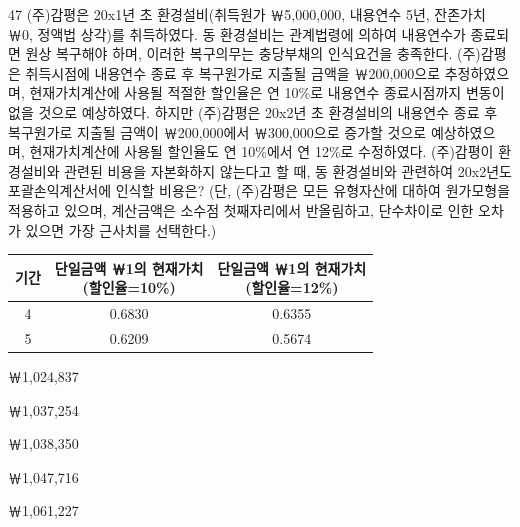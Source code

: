 \begin{question}{47}
(주)감평은 20x1년 초 환경설비(취득원가 ￦5,000,000, 내용연수 5년, 잔존가치 ￦0, 정액법 상각)를 취득하였다. 동 환경설비는 관계법령에 의하여 내용연수가 종료되면 원상 복구해야 하며, 이러한 복구의무는 충당부채의 인식요건을 충족한다. (주)감평은 취득시점에 내용연수 종료 후 복구원가로 지출될 금액을 ￦200,000으로 추정하였으며, 현재가치계산에 사용될 적절한 할인율은 연 10\%로 내용연수 종료시점까지 변동이 없을 것으로 예상하였다. 하지만 (주)감평은 20x2년 초 환경설비의 내용연수 종료 후 복구원가로 지출될 금액이 ￦200,000에서 ￦300,000으로 증가할 것으로 예상하였으며, 현재가치계산에 사용될 할인율도 연 10\%에서 연 12\%로 수정하였다. (주)감평이 환경설비와 관련된 비용을 자본화하지 않는다고 할 때, 동 환경설비와 관련하여 20x2년도 포괄손익계산서에 인식할 비용은? (단, (주)감평은 모든 유형자산에 대하여 원가모형을 적용하고 있으며, 계산금액은 소수점 첫째자리에서 반올림하고, 단수차이로 인한 오차가 있으면 가장 근사치를 선택한다.)
\par{\small\centering\begin{tabular}{|c|c|c|}\hline
기간 & \makecell{단일금액 ￦1의 현재가치\\(할인율=10\%)} & \makecell{단일금액 ￦1의 현재가치\\(할인율=12\%)} \\ \hline
4 & 0.6830 & 0.6355 \\ \hline
5 & 0.6209 & 0.5674 \\ \hline
\end{tabular}\par}
\begin{choices}
  \item ￦1,024,837
  \item ￦1,037,254
  \item ￦1,038,350
  \item ￦1,047,716
  \item ￦1,061,227
\end{choices}
\end{question}

